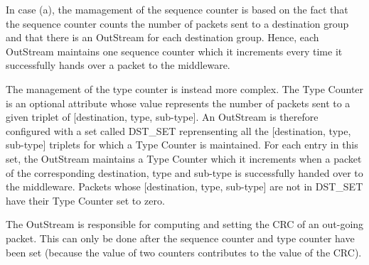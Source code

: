 In case (a), the mamagement of the sequence counter is based on the fact that the sequence counter counts the number of packets sent to a destination group and that there is an OutStream for each destination group. Hence, each OutStream maintains one sequence counter which it increments every time it successfully hands over a packet to the middleware.

The management of the type counter is instead more complex. The Type Counter is an optional attribute whose value represents the number of packets sent to a given triplet of [destination, type, sub-type]. An OutStream is therefore configured with a set called DST\_SET reprensenting all the [destination, type, sub-type] triplets for which a Type Counter is maintained. For each entry in this set, the OutStream maintains a Type Counter which it increments when a packet of the corresponding destination, type and sub-type is successfully handed over to the middleware. Packets whose [destination, type, sub-type] are not in DST\_SET have their Type Counter set to zero.

The OutStream is responsible for computing and setting the CRC of an out-going packet. This can only be done after the sequence counter and type counter have been set (because the value of two counters contributes to the value of the CRC).
 
